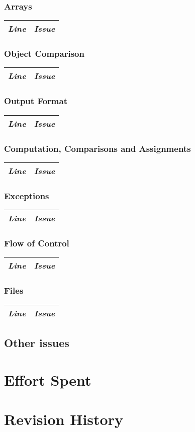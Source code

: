 \documentclass[11pt,a4paper]{report}
\begin{document}
\subsection{Arrays}
\begin{tabularx}{\textwidth}{|l|X|}
	\hline
	\textit{Line} & \textit{Issue}\\
	\hline
\end{tabularx}
\subsection{Object Comparison}
\begin{tabularx}{\textwidth}{|l|X|}
	\hline
	\textit{Line} & \textit{Issue}\\
	\hline
\end{tabularx}
\subsection{Output Format}
\begin{tabularx}{\textwidth}{|l|X|}
	\hline
	\textit{Line} & \textit{Issue}\\
	\hline
\end{tabularx}
\subsection{Computation, Comparisons and Assignments}
\begin{tabularx}{\textwidth}{|l|X|}
	\hline
	\textit{Line} & \textit{Issue}\\
	\hline
\end{tabularx}
\subsection{Exceptions}
\begin{tabularx}{\textwidth}{|l|X|}
	\hline
	\textit{Line} & \textit{Issue}\\
	\hline
\end{tabularx}
\subsection{Flow of Control}
\begin{tabularx}{\textwidth}{|l|X|}
	\hline
	\textit{Line} & \textit{Issue}\\
	\hline
\end{tabularx}
\subsection{Files}
\begin{tabularx}{\textwidth}{|l|X|}
	\hline
	\textit{Line} & \textit{Issue}\\
	\hline
\end{tabularx}
\section{Other issues}
\chapter{Effort Spent}
\chapter{Revision History}
\end{document}
